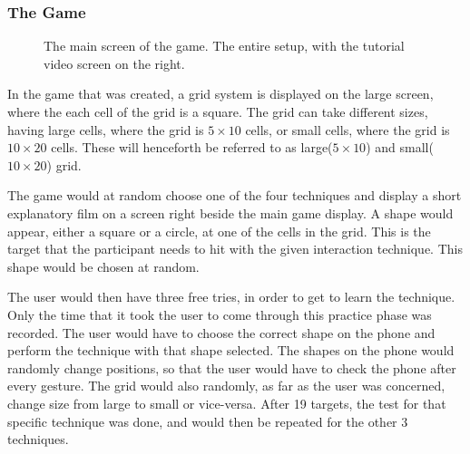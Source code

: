 \subsubsection{The Game}

\begin{figure}[H]
	\caption{
		\protect{} The main screen of the game.
		\protect{} The entire setup, with the tutorial video screen on the right.
	}
	\label{fig:allSetup}
\end{figure}

In the game that was created, a grid system is displayed on the large screen, where the each cell of the grid is a square. The grid can take different sizes, having large cells, where the grid is $5 \times 10$ cells, or small cells, where the grid is $10 \times 20$ cells. These will henceforth be referred to as large($5 \times 10$) and small($10 \times 20$) grid.

The game would at random choose one of the four techniques and display a short explanatory film on a screen right beside the main game display. A shape would appear, either a square or a circle, at one of the cells in the grid. This is the target that the participant needs to hit with the given interaction technique. This shape would be chosen at random. 

The user would then have three free tries, in order to get to learn the technique. Only the time that it took the user to come through this practice phase was recorded. The user would have to choose the correct shape on the phone and perform the technique with that shape selected. The shapes on the phone would randomly change positions, so that the user would have to check the phone after every gesture. The grid would also randomly, as far as the user was concerned, change size from large to small or vice-versa. After 19 targets, the test for that specific technique was done, and would then be repeated for the other 3 techniques. 


